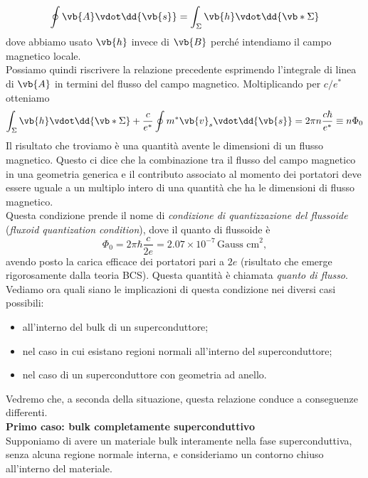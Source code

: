\begin{equation}
   \oint \vb{A}\vdot\dd{\vb{s}}
   =
   \int_{\Sigma}\vb{h}\vdot\dd{\vb*{\Sigma}}
   \label{eq:integrale_A_flusso_B}
\end{equation}
dove abbiamo usato $\vb{h}$ invece di $\vb{B}$ perché intendiamo il campo magnetico locale.\\
Possiamo quindi riscrivere la relazione precedente esprimendo l'integrale di linea di $\vb{A}$ in termini del flusso del campo magnetico. Moltiplicando per $c/e^*$ otteniamo
\begin{equation*}
    \int_{\Sigma}
    \vb{h}\vdot\dd{\vb*{\Sigma}}
    +
    \frac{c}{e^*}
    \oint
    m^*\vb{v}_s\vdot\dd{\vb{s}}
    =
    2\pi n\frac{c\hbar}{e^*}
    \equiv
    n\Phi_0
\end{equation*}
Il risultato che troviamo è una quantità avente le dimensioni di un flusso magnetico. Questo ci dice che la combinazione tra il flusso del campo magnetico in una geometria generica e il contributo associato al momento dei portatori deve essere uguale a un multiplo intero di una quantità che ha le dimensioni di flusso magnetico.\\
Questa condizione prende il nome di \emph{condizione di quantizzazione del flussoide} (\emph{fluxoid quantization condition}), dove il quanto di flussoide è
\begin{equation*}
   \Phi_0
   =
   2\pi\hbar\frac{c}{2e}
   =
   2.07\times10^{-7}\,\text{Gauss cm}^2,
\end{equation*}
avendo posto la carica efficace dei portatori pari a $2e$ (risultato che emerge rigorosamente dalla teoria BCS). Questa quantità è chiamata \emph{quanto di flusso}.\\
Vediamo ora quali siano le implicazioni di questa condizione nei diversi casi possibili:
\begin{itemize}[leftmargin=0.5cm]
   \item all'interno del bulk di un superconduttore;
   \item nel caso in cui esistano regioni normali all'interno del superconduttore;
   \item nel caso di un superconduttore con geometria ad anello.
\end{itemize}
Vedremo che, a seconda della situazione, questa relazione conduce a conseguenze differenti.\\[0.2cm]
\textbf{Primo caso: bulk completamente superconduttivo}\\
Supponiamo di avere un materiale bulk interamente nella fase superconduttiva, senza alcuna regione normale interna, e consideriamo un contorno chiuso all'interno del materiale.
